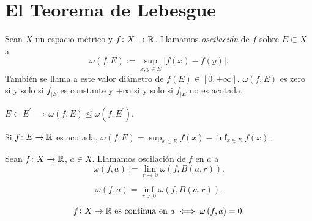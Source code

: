 \section{El Teorema de Lebesgue}
\begin{defi}
    Sean $X$ un espacio métrico y $f\colon X \to \mathbb{R}$. Llamamos
    \textit{oscilación} de $f$ sobre $E \subset X$ a
    \[
        \omega\left( f, E \right) := \sup_{x, y \in E} \left| f\left( x\right) -
        f\left( y\right)\right|.
    \]
    También se llama a este valor diámetro de $f\left( E\right) \in \left[
    0, +\infty \right]$. $\omega\left( f, E \right)$ es zero si y solo si $f_{|E}$ es
    constante y $+\infty$ si y solo si $f_{|E}$ no es acotada.
\end{defi}
\begin{obs}
    $E \subset E^{\prime} \implies \omega\left( f, E\right) \leq \omega\left( f, E^{
    \prime}\right)$.
\end{obs}
\begin{lema}
    Si $f\colon E \to \mathbb{R}$ es acotada, $\omega \left( f, E \right)= \sup_{x\in E}
    f\left( x\right) - \inf_{x\in E} f\left( x\right)$.
\end{lema}
\begin{defi}
    Sean $f\colon X \to \mathbb{R}$, $a\in X$. Llamamos oscilación de $f$ en $a$ a
    \[
        \omega\left( f, a\right) := \lim_{r\to 0} \omega\left( f, B\left( a, r
        \right) \right).
    \]
\end{defi}
\begin{obs}
    \[
        \omega\left( f, a\right) = \inf_{r>0} \omega\left( f, B\left(
        a, r\right) \right).
    \]
\end{obs}
\begin{lema}
    \[
        f\colon X \to \mathbb{R} \text{  es contínua en $a$} \iff \omega\left( f, a\right)
        = 0.
    \]
\end{lema}
